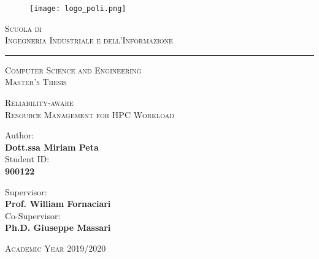 %
%
\begin{titlepage}
	\begin{center}
\begin{figure}
    \centering
    \texttt{[image: logo\_poli.png]}
\end{figure}
    \textsc{Scuola di\\Ingegneria Industriale e dell'Informazione}

\noindent\rule[0.5ex]{\linewidth}{0.4pt}
\textsc{Computer Science and Engineering\\Master's Thesis} \\
\end{center}
\vspace*{\fill}
\begin{center}
   \textsc{\LARGE Reliability-aware\\ Resource Management for HPC Workload} \\
\end{center}
\vspace*{\fill}
\begin{flushright}
Author:\\
\textbf{Dott.ssa Miriam Peta}\\
Student ID:\\
\textbf{900122} \\ 
\end{flushright}
\vspace*{\fill}
Supervisor:\\
\textbf{Prof. William Fornaciari} \\
\newline
Co-Supervisor:\\
\textbf{Ph.D. Giuseppe Massari}

\vspace*{\fill}

\begin{center}
\textsc{Academic Year 2019/2020}\\
\end{center}
\restoregeometry
\end{titlepage}